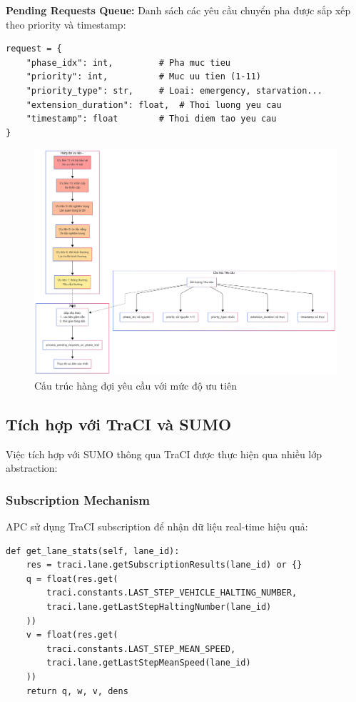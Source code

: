 \documentclass[12pt,a4paper,oneside]{report}
\begin{document}
\textbf{Pending Requests Queue:} Danh sách các yêu cầu chuyển pha được sắp xếp theo priority và timestamp:
\begin{lstlisting}[style=py]
request = {
    "phase_idx": int,         # Pha muc tieu
    "priority": int,          # Muc uu tien (1-11)
    "priority_type": str,     # Loai: emergency, starvation...
    "extension_duration": float,  # Thoi luong yeu cau
    "timestamp": float        # Thoi diem tao yeu cau
}
\end{lstlisting}
\begin{figure}[H]
    \centering
    \includegraphics[width= 1.1\textwidth]{Untitled diagram _ Mermaid Chart-2025-08-22-072612.png}
    \caption{Cấu trúc hàng đợi yêu cầu với mức độ ưu tiên}
    \label{fig:priority_queue}
\end{figure}
\subsection{Tích hợp với TraCI và SUMO}

Việc tích hợp với SUMO thông qua TraCI được thực hiện qua nhiều lớp abstraction:

\subsubsection{Subscription Mechanism}
APC sử dụng TraCI subscription để nhận dữ liệu real-time hiệu quả:

\begin{lstlisting}[style=py, caption={Xử lý subscription results}]
def get_lane_stats(self, lane_id):
    res = traci.lane.getSubscriptionResults(lane_id) or {}
    q = float(res.get(
        traci.constants.LAST_STEP_VEHICLE_HALTING_NUMBER,
        traci.lane.getLastStepHaltingNumber(lane_id)
    ))
    v = float(res.get(
        traci.constants.LAST_STEP_MEAN_SPEED,
        traci.lane.getLastStepMeanSpeed(lane_id)
    ))
    return q, w, v, dens
\end{lstlisting}
\end{document}
